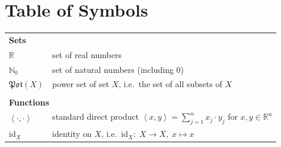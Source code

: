 \documentclass[a4paper, 10pt]{article}\usepackage[]{graphicx}\usepackage[]{color}
\numberwithin{equation}{section}
\theoremstyle{definition}
\theoremstyle{plain}
\newcommand{\R}{\ensuremath{\mathbb{R}}\xspace}
\newcommand{\NN}{\ensuremath{\mathbb{N}_0}\xspace}
\newcommand{\Pot}{\ensuremath{\mathfrak{Pot}}\xspace}
\newcommand{\skp}[1]{\left\langle#1\right\rangle}
\newcommand{\id}{\text{id}}
\begin{document}
\section*{Table of Symbols}\footnotesize
\begin{tabularx}{\textwidth}{lX}
\multicolumn{2}{l}{\textbf{Sets}}\\
\R& set of real numbers\\
\NN& set of natural numbers (including 0)\\
$\Pot(X)$ & power set of set $X$, i.e.\ the set of all subsets of $X$\\
\\
\multicolumn{2}{l}{\textbf{Functions}}\\
$\skp{\cdot,\cdot}$ & standard direct product $\skp{x,y}=\sum_{j=1}^nx_j\cdot y_j$ for $x,y\in\R^n$\\
$\id_X$ & identity on $X$, i.e.\ $\id_X:\;X\rightarrow X,\;x\mapsto x$\\
\end{tabularx}

\normalsize

\newpage
\end{document}
